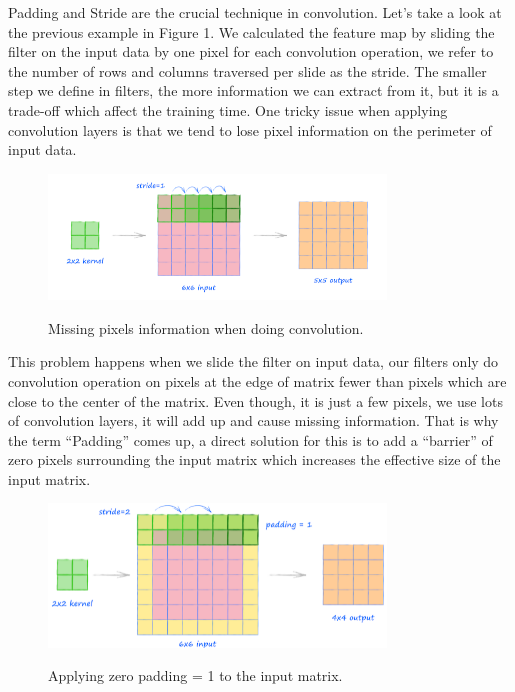 	Padding and Stride are the crucial technique in convolution. Let’s take a look at the previous example in Figure 1. We calculated the feature map by sliding the filter on the input data by one pixel for each convolution operation, we refer to the number of rows and columns traversed per slide as the stride. The smaller step we define in filters, the more information we can extract from it, but it is a trade-off which affect the training time. One tricky issue when applying convolution layers is that we tend to lose pixel information on the perimeter of input data.
	
	\begin{figure}[H]
		\centering
		{\includegraphics[width=0.8\textwidth]{./hinhanh/chap3/padding.png}}
		\caption{Missing pixels information when doing convolution.}
	\end{figure}

	This problem happens when we slide the filter on input data, our filters only do convolution operation on pixels at the edge of matrix fewer than pixels which are close to the center of the matrix. Even though, it is just a few pixels, we use lots of convolution layers, it will add up and cause missing information. That is why the term “Padding” comes up, a direct solution for this is to add a “barrier” of zero pixels surrounding the input matrix which increases the effective size of the input matrix.
	
	\begin{figure}[H]
		\centering
		{\includegraphics[width=0.8\textwidth]{./hinhanh/chap3/zero_padding.png}}
		\caption{Applying zero padding = 1 to the input matrix.}
	\end{figure}
	
